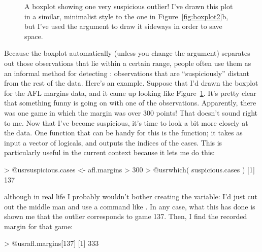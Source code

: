 \begin{figure}[t]
\begin{center}
\caption{A boxplot showing one very suspicious outlier! I've drawn this plot in a similar, minimalist style to the one in Figure~\ref{fig:boxplot2}b, but I've used the  argument to draw it sideways in order to save space.}
\label{fig:boxplotoutlier}
\HR
\end{center}
\end{figure}
Because the boxplot automatically (unless you change the  argument) separates out those observations that lie within a certain range, people often use them as an informal method for detecting : observations that are ``suspiciously'' distant from the rest of the data. Here's an example. Suppose that I'd drawn the boxplot for the AFL margins data, and it came up looking like Figure~\ref{fig:boxplotoutlier}. It's pretty clear that something funny is going on with one of the observations. Apparently, there was one game in which the margin was over 300 points! That doesn't sound right to me. Now that I've become suspicious, it's time to look a bit more closely at the data. One function that can be handy for this is the  function; it takes as input a vector of logicals, and outputs the indices of the  cases. This is particularly useful in the current context because it lets me do this:
\begin{rblock1}
> @usr{suspicious.cases <- afl.margins > 300}
> @usr{which( suspicious.cases )}
[1] 137
\end{rblock1}
although in real life I probably wouldn't bother creating the  variable: I'd just cut out the middle man and use a command like . In any case, what this has done is shown me that the outlier corresponds to game 137. Then, I find the recorded margin for that game:
\begin{rblock1}
> @usr{afl.margins[137]}
[1] 333
\end{rblock1}
